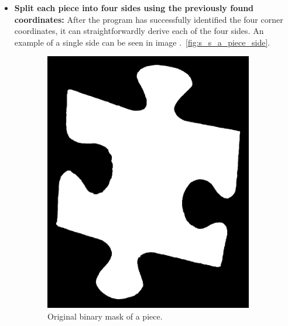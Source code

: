 \documentclass{article}
\begin{document}
\begin{itemize}
  \item \textbf{Split each piece into four sides using the previously found coordinates:}\newline
	After the program has successfully identified the four corner coordinates,
  it can straightforwardly derive each of the four sides.
  An example of a single side can be seen in image .~\ref{fig:s_s_a_piece_side}.
\end{itemize}

\begin{figure}
  \begin{subfigure}{0.3\textwidth}
    \centering
    \includegraphics[width=\linewidth]{pictures/original_piece.jpeg}
    \caption{Original binary mask of a piece.}
    \label{fig:s_s_og}
  \end{subfigure}
  \hfill
  \begin{subfigure}{0.3\textwidth}
    \centering

\end{subfigure}
\end{figure}
\end{document}
